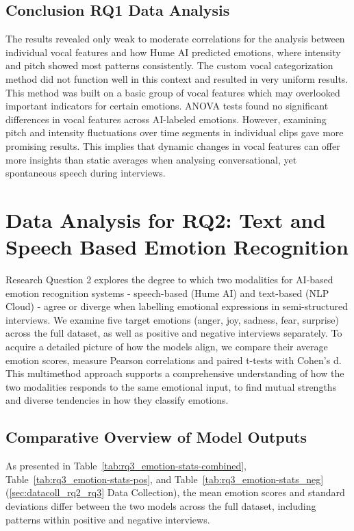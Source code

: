 \subsection{Conclusion RQ1 Data Analysis}
The results revealed only weak to moderate correlations for the analysis between individual vocal features and how Hume AI predicted emotions, where intensity and pitch showed most patterns consistently. 
The custom vocal categorization method did not function well in this context and resulted in very uniform results. This method was built on a basic group of vocal features which may overlooked important indicators for certain emotions. 
ANOVA tests found no significant differences in vocal features across AI-labeled emotions. However, examining pitch and intensity fluctuations over time segments in individual clips gave more promising results. This implies that dynamic changes in vocal features 
can offer more insights than static averages when analysing conversational, yet spontaneous speech during interviews. 

\section{Data Analysis for RQ2: Text and Speech Based Emotion Recognition}
Research Question 2 explores the degree to which two modalities for AI-based emotion recognition systems - speech-based (Hume AI) and text-based (NLP Cloud) - agree or diverge when labelling emotional expressions in semi-structured interviews. 
We examine five target emotions (anger, joy, sadness, fear, surprise) across the full dataset, as well as positive and negative interviews separately. To acquire a detailed picture of how the models align, we compare their average emotion scores, 
measure Pearson correlations and paired t-tests with Cohen’s d. This multimethod approach supports a comprehensive understanding of how the two modalities responds to the same emotional input, to find mutual strengths and diverse tendencies in how they classify emotions. 
\subsection{Comparative Overview of Model Outputs}

As presented in Table~\ref{tab:rq3_emotion-stats-combined}, Table~\ref{tab:rq3_emotion-stats-pos}, and Table~\ref{tab:rq3_emotion-stats_neg} (\ref{sec:datacoll_rq2_rq3} Data Collection),
the mean emotion scores and standard deviations differ between the two models across the full dataset,
including patterns within positive and negative interviews. 

